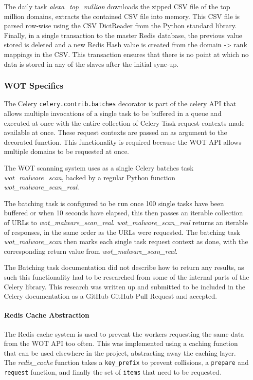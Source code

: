 The daily task \emph{alexa\_top\_million} downloads the zipped CSV file of the top million domains, extracts the contained CSV file into memory. This CSV file is parsed row-wise using the CSV DictReader from the Python standard library. Finally, in a single transaction to the master Redis database, the previous value stored is deleted and a new Redis Hash value is created from the domain -> rank mappings in the CSV. This transaction ensures that there is no point at which no data is stored in any of the slaves after the initial sync-up.

\subsubsection{WOT Specifics}
The Celery \verb`celery.contrib.batches` decorator is part of the celery API that allows multiple invocations of a single task to be buffered in a queue and executed at once with the entire collection of Celery Task request contexts made available at once. These request contexts are passed an as argument to the decorated function. This functionality is required because the WOT API allows multiple domains to be requested at once.

The WOT scanning system uses as a single Celery batches task \emph{wot\_malware\_scan}, backed by a regular Python function \emph{wot\_malware\_scan\_real}.

The batching task is configured to be run once 100 single tasks have been buffered or when 10 seconds have elapsed, this then passes an iterable collection of URLs to \emph{wot\_malware\_scan\_real}. \emph{wot\_malware\_scan\_real} returns an iterable of responses, in the same order as the URLs were requested. The batching task \emph{wot\_malware\_scan} then marks each single task request context as done, with the corresponding return value from \emph{wot\_malware\_scan\_real}\cite{celery-batches}.

The Batching task documentation did not describe how to return any results, as such this functionality had to be researched from some of the internal parts of the Celery library.  This research was written up and submitted to be included in the Celery documentation as a GitHub GitHub Pull Request and accepted\cite{celery-batches-fix}.

\paragraph{Redis Cache Abstraction}
The Redis cache system is used to prevent the workers requesting the same data from the WOT API too often.  This was implemented using a caching function that can be used elsewhere in the project, abstracting away the caching layer.  The \emph{redis\_cache} function takes a \verb`key_prefix` to prevent collisions, a \verb`prepare` and \verb`request` function, and finally the set of \verb`items` that need to be requested.

